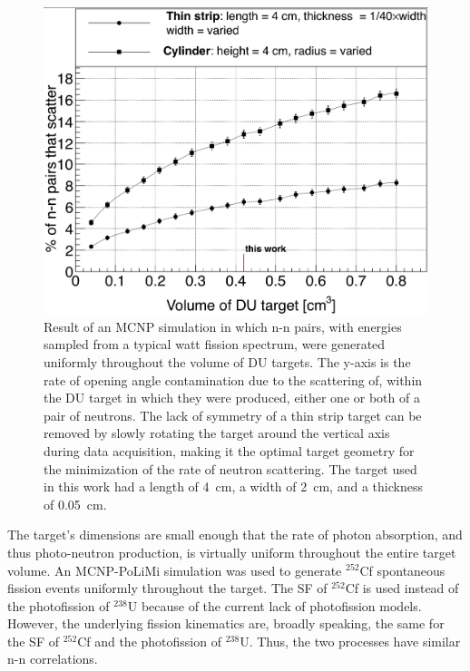 \begin{figure}
    \centering
    \includegraphics[width = \figsize\textwidth]{ElasticScatteringPlot.png}
    \caption{
     Result of an MCNP simulation in which n-n pairs, with energies sampled from a typical watt fission spectrum, were generated uniformly throughout the volume of DU targets.
        The y-axis is the rate of opening angle contamination due to the scattering of, within the DU target in which they were produced, either one or both of a pair of neutrons.
    The lack of symmetry of a thin strip target can be removed by slowly rotating the target around the vertical axis during data acquisition, making it the optimal target geometry for the minimization of the rate of neutron scattering.
    The target used in this work had a length of 4~cm, a width of 2~cm, and a thickness of 0.05~cm.
    }
    \label{fig:ElasticScatteringPlot}
\end{figure}

The target's dimensions are small enough that the rate of photon absorption, and thus photo-neutron production, is virtually uniform throughout the entire target volume.
An MCNP-PoLiMi simulation was used to generate $^{252}$Cf spontaneous fission events uniformly throughout the target.
The SF of $^{252}$Cf is used instead of the photofission of $^{238}$U because of the current lack of photofission models.
However, the underlying fission kinematics are, broadly speaking, the same for the SF of $^{252}$Cf and the photofission of $^{238}$U.
Thus, the two processes have similar n-n correlations.


